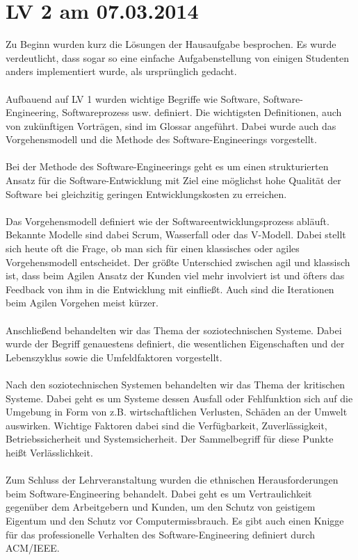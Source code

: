 \chapter{LV 2 am 07.03.2014}
Zu Beginn wurden kurz die Lösungen der Hausaufgabe besprochen. Es wurde verdeutlicht, dass sogar so eine einfache Aufgabenstellung von einigen Studenten anders implementiert wurde, als ursprünglich gedacht.
\\\\
Aufbauend auf LV 1 wurden wichtige Begriffe wie Software, Software-Engineering, Softwareprozess usw. definiert. Die wichtigsten Definitionen, auch von zukünftigen Vorträgen, sind im Glossar angeführt. Dabei wurde auch das Vorgehensmodell und die Methode des Software-Engineerings vorgestellt.
\\\\
Bei der Methode des Software-Engineerings geht es um einen strukturierten Ansatz für die Software-Entwicklung mit Ziel eine möglichst hohe Qualität der Software bei gleichzitig geringen Entwicklungskosten zu erreichen.
\\\\
Das Vorgehensmodell definiert wie der Softwareentwicklungsprozess abläuft. Bekannte Modelle sind dabei Scrum, Wasserfall oder das V-Modell. Dabei stellt sich heute oft die Frage, ob man sich für einen klassisches oder agiles Vorgehensmodell entscheidet. Der größte Unterschied zwischen agil und klassisch ist, dass beim Agilen Ansatz der Kunden viel mehr involviert ist und öfters das Feedback von ihm in die Entwicklung mit einfließt. Auch sind die Iterationen beim Agilen Vorgehen meist kürzer.
\\\\
Anschließend behandelten wir das Thema der soziotechnischen Systeme. Dabei wurde der Begriff genauestens definiert, die wesentlichen Eigenschaften und der Lebenszyklus sowie die Umfeldfaktoren vorgestellt.
\\\\
Nach den soziotechnischen Systemen behandelten wir das Thema der kritischen Systeme. Dabei geht es um Systeme dessen Ausfall oder Fehlfunktion sich auf die Umgebung in Form von z.B. wirtschaftlichen Verlusten, Schäden an der Umwelt  auswirken. Wichtige Faktoren dabei sind die Verfügbarkeit, Zuverlässigkeit, Betriebssicherheit und Systemsicherheit. Der Sammelbegriff für diese Punkte heißt Verlässlichkeit.
\\\\
Zum Schluss der Lehrveranstaltung wurden die ethnischen Herausforderungen beim Software-Engineering behandelt. Dabei geht es um Vertraulichkeit gegenüber dem Arbeitgebern und Kunden, um den Schutz von geistigem Eigentum und den Schutz vor Computermissbrauch. Es gibt auch einen Knigge für das professionelle Verhalten des Software-Engineering definiert durch ACM/IEEE.

